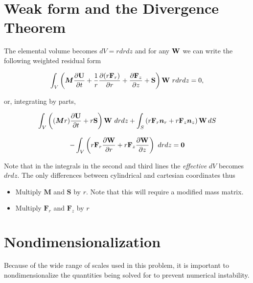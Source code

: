 \documentclass[12pt, a4paper]{report}
\begin{document}
\section{Weak form and the Divergence Theorem}
The elemental volume becomes $dV = r dr dz$ and for any ${\bf W}$ we can write the following weighted residual form



\begin{center}
\[\begin{array}{c} \displaystyle
\int_V \left({\bm M} \frac{\partial {\bf U}}{\partial t} +  \frac{1}{r} \frac{\partial (r {\bf F}_r)}{\partial r}  + \frac{\partial {\bf F}_z}{\partial z} +   {\bf S}\right) {\bf W} \ r dr dz  = 0 ,
\end{array} \]
\end{center}
or, integrating by parts, 
\begin{center}
\[\begin{array}{c}
\displaystyle \int_V \left(({\bm M} r) \frac{\partial {\bf U}}{\partial t}   +r{\bf S}\right) {\bf W} \ dr  dz  
\displaystyle + \int_S\left(  r {\bf F}_r {\bm n}_r +  r {\bf F}_z {\bm n}_z \right) {\bf W}  \, dS \\[4ex] - \displaystyle \int_V \left(  r {\bf F}_r\frac{\partial {\bf W}}{\partial r}  + r {\bf F}_z\frac{\partial {\bf W}}{\partial z} \right) \ dr  dz  = {\bf 0}
\end{array}
\]
\end{center}

Note that in the integrals in the second and third lines the {\em effective} $dV$ becomes $dr dz$. The only differences between cylindrical and cartesian coordinates thus

\begin{itemize}
\item Multiply $\bm M$ and $\bm S$ by $r$. Note that this will require a modified mass matrix.
\item Multiply ${\bm F}_r$ and ${\bm F}_z$ by $r$

\end{itemize}

\section{Nondimensionalization}

Because of the wide range of scales used in this problem, it is important to nondimensionalize the quantities being solved for to prevent numerical instability.
\end{document}
